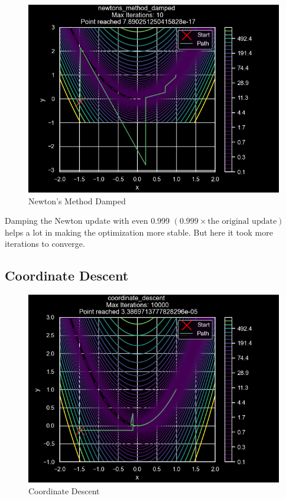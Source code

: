 \documentclass[
]{article}
\begin{document}
\begin{figure}
\centering
\includegraphics{images/newtons_method_damped.png}
\caption{Newton's Method Damped}
\end{figure}

Damping the Newton update with even 0.999 \((0.999 \times \text{the original update})\) helps a lot in making the optimization more stable. But here it took more iterations to converge.

\subsection{Coordinate Descent}\label{coordinate-descent}

\begin{figure}
\centering
\includegraphics{images/coordinate_descent.png}
\caption{Coordinate Descent}
\end{figure}
\end{document}
